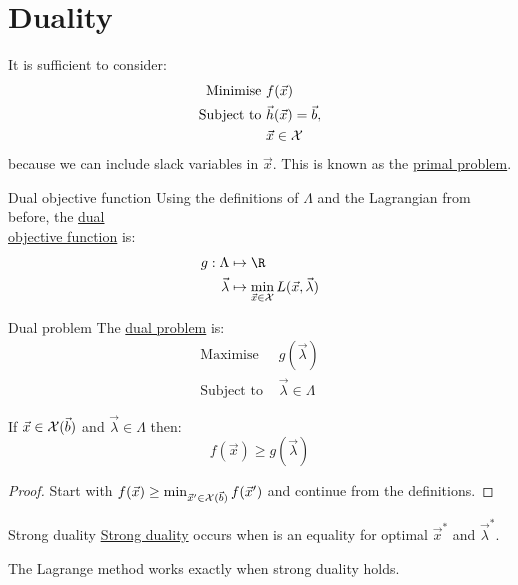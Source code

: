 \documentclass[../Main.tex]{subfiles}
\begin{document}
\section{Duality}
It is sufficient to consider:
\begin{align*}
    \text{Minimise } & f(\vec{x}) \\
    \text{Subject to } & \vec{h}(\vec{x}) = \vec{b}, \\
    & \vec{x} \in \mathcal{X}
\end{align*}
because we can include slack variables in $\vec{x}$. This is known as the \underline{primal problem}.
\begin{definition}{Dual objective function}
    Using the definitions of $\Lambda$ and the Lagrangian from before, the \underline{dual}\\\underline{objective function} is:
    \begin{align*}
        g : \Lambda &\mapsto \R\\
        \vec{\lambda} &\mapsto \min_{\vec{x} \in \Xset} L(\vec{x}, \vec{\lambda})
    \end{align*}
\end{definition}
\begin{definition}{Dual problem}
    The \underline{dual problem} is:
    \begin{align*}
        \text{Maximise } &g(\vec{\lambda}) \\
        \text{Subject to }& \vec{\lambda} \in \Lambda
    \end{align*}
\end{definition}
\begin{theorem}
    If $\vec{x} \in \mathcal{X}(\vec{b})$ and $\vec{\lambda} \in \Lambda$ then:
    \begin{equation}
        f(\vec{x}) \geq g(\vec{\lambda})
        \label{eqnWeakDuality}
    \end{equation}
    \label{thmWeakDuality}
\end{theorem}
\begin{proof}
    Start with $f(\vec{x}) \geq \min_{\vec{x}' \in \mathcal{X}(\vec{b})} f(\vec{x}')$ and continue from the definitions.
\end{proof}
\begin{definition}{Strong duality}
    \underline{Strong duality} occurs when  is an equality for optimal $\vec{x}^*$ and $\vec{\lambda}^*$.
\end{definition}
The Lagrange method works exactly when strong duality holds.
\end{document}
